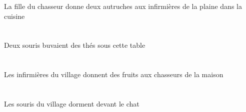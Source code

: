 \begin{exe}
La fille du chasseur donne deux autruches aux infirmières de la plaine dans la cuisine
\ex\glll
\DEMSgObl{}   \tableCSgObl{}   \SOUS{}   \INDDuErg{}   \sourisADuErg{}   \INDPlAbs{}   \theBPlAbs{}  \boireVtPstBPl{}\\
\DEMSgOblP{}   \tableCSgOblP{}   \SOUSP{}   \INDDuErgP{}   \sourisADuErgP{}   \INDPlAbsP{}   \theBPlAbsP{}  \boireVtPstBPlP{}\\
\DEMSgOblG{}   \tableCSgOblG{}   \SOUSG{}   \INDDuErgG{}   \sourisADuErgG{}   \INDPlAbsG{}   \theBPlAbsG{}  \boireVtPstBPlG{}\\
Deux souris buvaient des thés sous cette table
\ex\glll
\DEFSgObl{}   \maisonDSgObl{}   \DE{}   \DEFPlErg{}    \DEFSgObl{}   \villageASgObl{}   \DE{}   \infirmiereBPlErg{}    \DEFPlDat{}   \chasseurCPlDat{}   \INDPlAbs{}   \fruitBPlAbs{}  \donnerVdPrsBPl{}\\
\DEFSgOblP{}   \maisonDSgOblP{}   \DEP{}   \DEFPlErgP{}    \DEFSgOblP{}   \villageASgOblP{}   \DEP{}   \infirmiereBPlErgP{}    \DEFPlDatP{}   \chasseurCPlDatP{}   \INDPlAbsP{}   \fruitBPlAbsP{}  \donnerVdPrsBPlP{}\\
\DEFSgOblG{}   \maisonDSgOblG{}   \DEG{}   \DEFPlErgG{}    \DEFSgOblG{}   \villageASgOblG{}   \DEG{}   \infirmiereBPlErgG{}    \DEFPlDatG{}   \chasseurCPlDatG{}   \INDPlAbsG{}   \fruitBPlAbsG{}  \donnerVdPrsBPlG{}\\
Les infirmières du village donnent des fruits aux chasseurs de la maison
\ex\glll
\DEFPlAbs{}    \DEFSgObl{}   \villageASgObl{}   \DE{}   \sourisAPlAbs{}    \DEFSgObl{}   \chatDSgObl{}   \DEVANT{}  \dormirViPrsAPl{}\\
\DEFPlAbsP{}    \DEFSgOblP{}   \villageASgOblP{}   \DEP{}   \sourisAPlAbsP{}    \DEFSgOblP{}   \chatDSgOblP{}   \DEVANTP{}  \dormirViPrsAPlP{}\\
\DEFPlAbsG{}    \DEFSgOblG{}   \villageASgOblG{}   \DEG{}   \sourisAPlAbsG{}    \DEFSgOblG{}   \chatDSgOblG{}   \DEVANTG{}  \dormirViPrsAPlG{}\\
Les souris du village dorment devant le chat
\ex\glll
\DEFPlAbs{}    \DEFPlObl{}   \grandCPl{}   \maigreCPl{}   \filleCPlObl{}   \DE{}   \petitDPl{}   \litDPlAbs{}    \DEFSgObl{}   \chambreBSgObl{}   \DANS{}  \arriverViPrsDPl{}\\
\DEFPlAbsP{}    \DEFPlOblP{}   \grandCPlP{}   \maigreCPlP{}   \filleCPlOblP{}   \DEP{}   \petitDPlP{}   \litDPlAbsP{}    \DEFSgOblP{}   \chambreBSgOblP{}   \DANSP{}  \arriverViPrsDPlP{}\\
\DEFPlAbsG{}    \DEFPlOblG{}   \grandCPlG{}   \maigreCPlG{}   \filleCPlOblG{}   \DEG{}   \petitDPlG{}   \litDPlAbsG{}    \DEFSgOblG{}   \chambreBSgOblG{}   \DANSG{}  \arriverViPrsDPlG{}\\

\end{exe}
